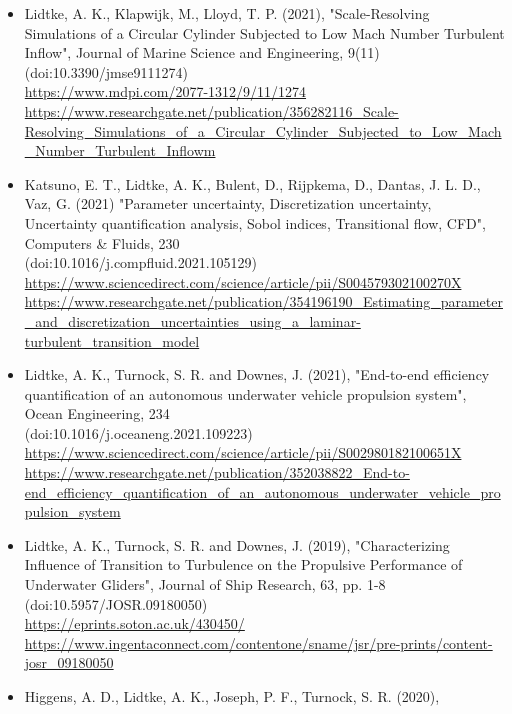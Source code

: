 \documentclass[a4paper,10pt]{article}
\begin{document}
\begin{itemize}
%
\item Lidtke, A. K., Klapwijk, M., Lloyd, T. P. (2021),
    "Scale-Resolving Simulations of a Circular Cylinder Subjected to Low Mach Number Turbulent Inflow",
    Journal of Marine Science and Engineering, 9(11)
    \cite{Lidtke2021b}
    \\ (doi:10.3390/jmse9111274)
    \\ \url{https://www.mdpi.com/2077-1312/9/11/1274}
    \\ \url{https://www.researchgate.net/publication/356282116_Scale-Resolving_Simulations_of_a_Circular_Cylinder_Subjected_to_Low_Mach_Number_Turbulent_Inflowm}
%
\item Katsuno, E. T., Lidtke, A. K., Bulent, D., Rijpkema, D., Dantas, J. L. D., Vaz, G. (2021)
    "Parameter uncertainty, Discretization uncertainty, Uncertainty quantification analysis, Sobol indices, Transitional flow, CFD",
    Computers \& Fluids, 230
    \cite{Katsuno2021}
    \\ (doi:10.1016/j.compfluid.2021.105129)
    \\ \url{https://www.sciencedirect.com/science/article/pii/S004579302100270X}
    \\ \url{https://www.researchgate.net/publication/354196190_Estimating_parameter_and_discretization_uncertainties_using_a_laminar-turbulent_transition_model}
%
\item Lidtke, A. K., Turnock, S. R. and Downes, J. (2021),
    "End-to-end efficiency quantification of an autonomous underwater vehicle propulsion system",
    Ocean Engineering, 234
    \cite{Lidtke2021a}
    \\ (doi:10.1016/j.oceaneng.2021.109223)
    \\ \url{https://www.sciencedirect.com/science/article/pii/S002980182100651X}
    \\ \url{https://www.researchgate.net/publication/352038822_End-to-end_efficiency_quantification_of_an_autonomous_underwater_vehicle_propulsion_system}
%
\item Lidtke, A. K., Turnock, S. R. and Downes, J. (2019),
	"Characterizing Influence of Transition to Turbulence on the Propulsive Performance of Underwater Gliders",
	Journal of Ship Research, 63, pp. 1-8
	\cite{Lidtke2019}
	\\ (doi:10.5957/JOSR.09180050)
	\\ \url{https://eprints.soton.ac.uk/430450/}
	\\ \url{https://www.ingentaconnect.com/contentone/sname/jsr/pre-prints/content-josr_09180050}
%
\item Higgens, A. D., Lidtke, A. K., Joseph, P. F., Turnock, S. R. (2020),

\end{itemize}
\end{document}
